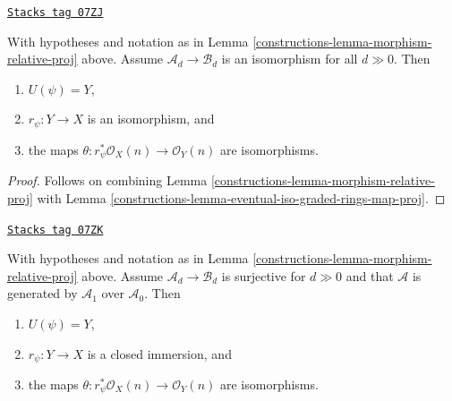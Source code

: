 \begin{lemma}
\label{constructions-lemma-eventual-iso-graded-rings-map-relative-proj}
\href{https://stacks.math.columbia.edu/tag/07ZJ}{\texttt{Stacks tag 07ZJ}}

With hypotheses and notation as in Lemma \ref{constructions-lemma-morphism-relative-proj}
above. Assume $\mathcal{A}_d \to \mathcal{B}_d$ is an isomorphism for all
$d \gg 0$. Then
\begin{enumerate}
\item $U(\psi) = Y$,
\item $r_\psi : Y \to X$ is an isomorphism, and
\item the maps $\theta : r_\psi^*\mathcal{O}_X(n) \to \mathcal{O}_Y(n)$
are isomorphisms.
\end{enumerate}
\end{lemma}

\begin{proof}

Follows on combining
Lemma \ref{constructions-lemma-morphism-relative-proj}
with
Lemma \ref{constructions-lemma-eventual-iso-graded-rings-map-proj}.
\end{proof}

\begin{lemma}
\label{constructions-lemma-surjective-generated-degree-1-map-relative-proj}
\href{https://stacks.math.columbia.edu/tag/07ZK}{\texttt{Stacks tag 07ZK}}

With hypotheses and notation as in Lemma \ref{constructions-lemma-morphism-relative-proj}
above. Assume $\mathcal{A}_d \to \mathcal{B}_d$ is surjective for $d \gg 0$
and that $\mathcal{A}$ is generated by $\mathcal{A}_1$ over $\mathcal{A}_0$.
Then
\begin{enumerate}
\item $U(\psi) = Y$,
\item $r_\psi : Y \to X$ is a closed immersion, and
\item the maps $\theta : r_\psi^*\mathcal{O}_X(n) \to \mathcal{O}_Y(n)$
are isomorphisms.
\end{enumerate}
\end{lemma}

